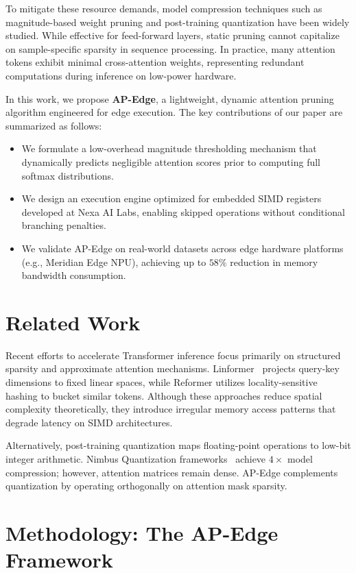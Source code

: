 \documentclass[runningheads]{llncs}
\begin{document}
To mitigate these resource demands, model compression techniques such as magnitude-based weight pruning and post-training quantization have been widely studied. While effective for feed-forward layers, static pruning cannot capitalize on sample-specific sparsity in sequence processing. In practice, many attention tokens exhibit minimal cross-attention weights, representing redundant computations during inference on low-power hardware.

In this work, we propose \textbf{AP-Edge}, a lightweight, dynamic attention pruning algorithm engineered for edge execution. The key contributions of our paper are summarized as follows:
\begin{itemize}
    \item We formulate a low-overhead magnitude thresholding mechanism that dynamically predicts negligible attention scores prior to computing full softmax distributions.
    \item We design an execution engine optimized for embedded SIMD registers developed at Nexa AI Labs, enabling skipped operations without conditional branching penalties.
    \item We validate AP-Edge on real-world datasets across edge hardware platforms (e.g., Meridian Edge NPU), achieving up to $58\%$ reduction in memory bandwidth consumption.
\end{itemize}

\section{Related Work}
Recent efforts to accelerate Transformer inference focus primarily on structured sparsity and approximate attention mechanisms. Linformer~\cite{chen2023linformer} projects query-key dimensions to fixed linear spaces, while Reformer utilizes locality-sensitive hashing to bucket similar tokens. Although these approaches reduce spatial complexity theoretically, they introduce irregular memory access patterns that degrade latency on SIMD architectures.

Alternatively, post-training quantization maps floating-point operations to low-bit integer arithmetic. Nimbus Quantization frameworks~\cite{rostova2024nimbus} achieve $4\times$ model compression; however, attention matrices remain dense. AP-Edge complements quantization by operating orthogonally on attention mask sparsity.

\section{Methodology: The AP-Edge Framework}
\end{document}

